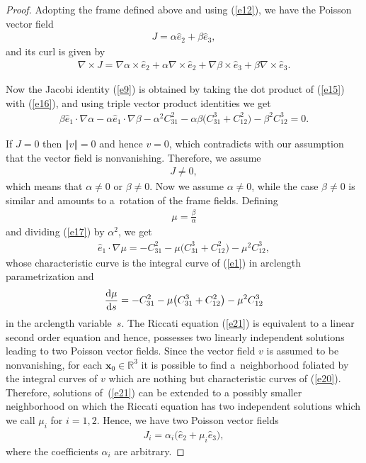 \documentclass[10pt,a4paper]{amsart}
\numberwithin{equation}{section}
\begin{document}
\begin{proof}
Adopting the frame def\/ined above and using (\ref{e12}), we have the Poisson vector f\/ield
\begin{gather}
J=\alpha \widehat{e}_{2}+\beta \widehat{e}_{3}, \label{e15}
\end{gather}
and its curl is given by
\begin{gather}
\nabla \times J=\nabla \alpha \times \widehat{e}_{2}+\alpha \nabla \times \widehat{e}_{2}+\nabla \beta \times \widehat{e}_{3}+\beta \nabla \times \widehat{e}_{3}. \label{e16}
\end{gather}

Now the Jacobi identity (\ref{e9}) is obtained by taking the dot product of (\ref{e15}) with (\ref{e16}), and using triple vector product identities we get
\begin{gather}
\beta \widehat{e}_{1}\cdot \nabla \alpha -\alpha \widehat{e}_{1}\cdot \nabla\beta -\alpha ^{2}C_{31}^{2}-\alpha \beta \big(C_{31}^{3}+C_{12}^{2}\big) -\beta ^{2}C_{12}^{3}=0. \label{e17}
\end{gather}

If $J=0$ then $\Vert v\Vert =0$ and hence $v=0$, which contradicts with our assumption that the vector f\/ield is nonvanishing. Therefore, we assume
\begin{gather*}
J\neq 0,
\end{gather*}
which means that $\alpha \neq 0$ or $\beta \neq 0$. Now we assume $\alpha \neq 0$, while the case $\beta \neq 0$ is similar and amounts to a~rotation of the frame f\/ields. Def\/ining
\begin{gather*}
\mu =\frac{\beta }{\alpha }
\end{gather*}
and dividing (\ref{e17}) by $\alpha ^{2}$, we get
\begin{gather}
\widehat{e}_{1}\cdot \nabla \mu =-C_{31}^{2}-\mu \big( C_{31}^{3}+C_{12}^{2}\big) -\mu ^{2}C_{12}^{3}, \label{e20}
\end{gather}
whose characteristic curve is the integral curve of (\ref{e1}) in arclength parametrization and
\begin{gather}
\frac{{\rm d}\mu }{{\rm d}s}=-C_{31}^{2}-\mu \big( C_{31}^{3}+C_{12}^{2}\big) -\mu ^{2}C_{12}^{3} \label{e21}
\end{gather}
in the arclength variable~$s$. The Riccati equation (\ref{e21}) is equivalent to a linear second order equation and hence, possesses two linearly independent solutions leading to two Poisson vector f\/ields. Since the vector f\/ield $v$ is assumed to be nonvanishing, for each $\boldsymbol{x}_{0}\in \mathbb{R}^{3}$ it is possible to f\/ind a~neighborhood foliated by the integral curves of $v$ which are nothing but characteristic curves of (\ref{e20}). Therefore, solutions of~(\ref{e21}) can be extended to a possibly smaller neighborhood on which the
Riccati equation has two independent solutions which we call $\mu _{i}$ for $i=1,2$. Hence, we have two Poisson vector f\/ields
\begin{gather}
J_{i}=\alpha _{i} \big( \widehat{e}_{2}+\mu _{i}\widehat{e}_{3} \big), \label{e22}
\end{gather}
where the coef\/f\/icients $\alpha _{i}$ are arbitrary.
\end{proof}
\end{document}
